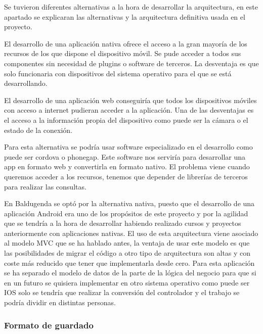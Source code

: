 Se tuvieron diferentes alternativas a la hora de desarrollar la arquitectura, en este apartado se explicaran las alternativas y la arquitectura definitiva usada en el proyecto.


El desarrollo de una aplicación nativa ofrece el acceso a la gran mayoría de los recursos de los que dispone el dispositivo móvil. 
Se pude acceder a todos sus componentes sin necesidad de plugins o software de terceros.
La desventaja es que solo funcionaria con dispositivos del sistema operativo para el que se está desarrollando.

El desarrollo de una aplicación web conseguiría que todos los dispositivos móviles con acceso a internet pudieran acceder a la aplicación.
Una de las desventajas es el acceso a la información propia del dispositivo como puede ser la cámara o el estado de la conexión.

Para esta alternativa se podría usar software especializado en el desarrollo como puede ser cordova o phonegap. Este software nos serviría para desarrollar una app en formato web y convertirla en formato nativo.
El problema viene cuando queremos acceder a los recursos, tenemos que depender de librerías de terceros para realizar las consultas.

En Baldugenda se optó por la alternativa nativa, puesto que el desarrollo de una aplicación Android era uno de los propósitos de este proyecto y por la agilidad que se tendría a la hora de desarrollar habiendo realizado cursos  y proyectos anteriormente con aplicaciones nativas.
El uso de esta arquitectura viene asociado al modelo MVC que se ha hablado antes, la ventaja de usar este modelo es que las posibilidades de migrar el código a otro tipo de arquitectura son altas y con coste más reducido que tener que implementarla desde cero.
Para esta aplicación se ha separado el modelo de datos de la parte de la lógica del negocio para que si en un futuro se quisiera implementar en otro sistema operativo como puede ser IOS solo se tendría que realizar la conversión del controlador y el trabajo se podría dividir en distintas personas.

\subsubsection{Formato de guardado}
\label{subsubsecc:formato de guardado}

